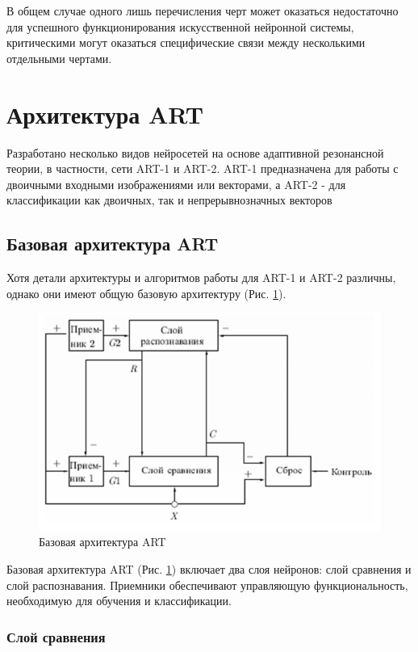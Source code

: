 \documentclass[14pt,a4paper,report]{article}
\begin{document}
В общем случае одного лишь перечисления черт может оказаться недостаточно для успешного функционирования искусственной нейронной системы, критическими могут оказаться специфические связи между несколькими отдельными чертами.

\section{Архитектура ART}

Разработано несколько видов нейросетей на основе адаптивной резонансной теории, в частности, сети ART-1 и ART-2. ART-1 предназначена для работы с двоичными входными изображениями или векторами, а ART-2 - для классификации как двоичных, так и непрерывнозначных векторов \cite{cite-life-prog} 

\subsection{Базовая архитектура ART}

Хотя детали архитектуры и алгоритмов работы для ART-1 и ART-2 различны, однако они имеют общую базовую архитектуру (Рис. \ref{art-base}).

\begin{figure}[h!]
	\centering
	\includegraphics[scale = 0.80]{images/3.png}
	\caption{Базовая архитектура ART}
	\label{art-base}
\end{figure}

Базовая архитектура ART (Рис. \ref{art-base}) включает два слоя нейронов: слой сравнения и слой распознавания. Приемники обеспечивают управляющую функциональность, необходимую для обучения и классификации.

\subsubsection{Слой сравнения}
\end{document}

